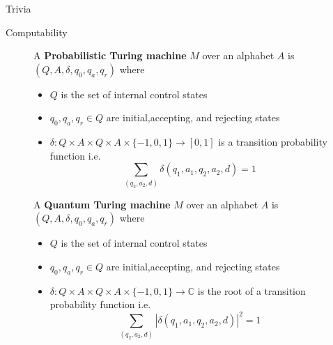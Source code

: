 \documentclass{beamer}
\begin{document}
\begin{frame}{\textbf{}}
\begin{center} \Huge Trivia \end{center}
\end{frame}

\begin{frame}{Computability}

\begin{figure}[ht]
{\small
    \begin{minipage}{0.4\textwidth}
       A \textbf{Probabilistic Turing machine} $M$ over an alphabet $A$ is $\left(Q,A,\delta,q_0,q_a,q_r\right)$ where
       \begin{itemize}
         \item $Q$ is the set of internal control states
         \item $q_0,q_a,q_r\in Q$ are initial,accepting, and rejecting states
         \item $\delta:Q\times A\times Q\times A\times\{-1,0,1\}\to [0,1]$ is a transition probability function i.e.
           \[
             \sum_{\left(q_2,a_2,d\right)}\delta\left(q_1,a_1,q_2,a_2,d\right)=1
           \]
       \end{itemize}
    \end{minipage}
    \qquad
    \begin{minipage}{0.4\textwidth}
       A \textbf{Quantum Turing machine} $M$ over an alphabet $A$ is $\left(Q,A,\delta,q_0,q_a,q_r\right)$ where
       \begin{itemize}
         \item $Q$ is the set of internal control states
         \item $q_0,q_a,q_r\in Q$ are initial,accepting, and rejecting states
         \item $\delta:Q\times A\times Q\times A\times\{-1,0,1\}\to \mathbb{C}$ is the root of a transition probability function i.e.
           \[
             \sum_{\left(q_2,a_2,d\right)}|\delta\left(q_1,a_1,q_2,a_2,d\right)|^2=1
           \]
       \end{itemize}
    \end{minipage}
}
\end{figure}

\end{frame}
\end{document}
